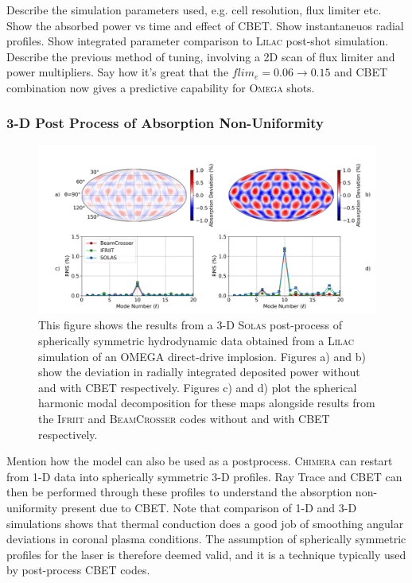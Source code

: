 Describe the simulation parameters used, e.g. cell resolution, flux limiter etc.
Show the absorbed power vs time and effect of CBET.
Show instantaneuos radial profiles.
Show integrated parameter comparison to \textsc{Lilac} post-shot simulation.
Describe the previous method of tuning, involving a 2D scan of flux limiter and power multipliers.
Say how it's great that the $flim_e = 0.06 \rightarrow 0.15$ and CBET combination now gives a predictive capability for \textsc{Omega} shots.

\subsubsection{3-D Post Process of Absorption Non-Uniformity}

\begin{figure}[t!]
    \includegraphics[width=1.0\linewidth]{Numerics/Images/DepositionAsymmetries_mollweide_xy32.png}
    \centering
    \caption{This figure shows the results from a 3-D \textsc{Solas} post-process of spherically symmetric hydrodynamic data obtained from a \textsc{Lilac} simulation of an OMEGA direct-drive implosion.
    Figures a) and b) show the deviation in radially integrated deposited power without and with \ac{CBET} respectively.
    Figures c) and d) plot the spherical harmonic modal decomposition for these maps alongside results from the \textsc{Ifriit} and \textsc{BeamCrosser} codes without and with \ac{CBET} respectively.}%
    \label{fig:SOLAS_qpR_IFRIIT_test}
\end{figure}

Mention how the model can also be used as a postprocess.
\textsc{Chimera} can restart from 1-D data into spherically symmetric 3-D profiles.
Ray Trace and CBET can then be performed through these profiles to understand the absorption non-uniformity present due to CBET.
Note that comparison of 1-D and 3-D simulations shows that thermal conduction does a good job of smoothing angular deviations in coronal plasma conditions.
The assumption of spherically symmetric profiles for the laser is therefore deemed valid, and it is a technique typically used by post-process CBET codes.

